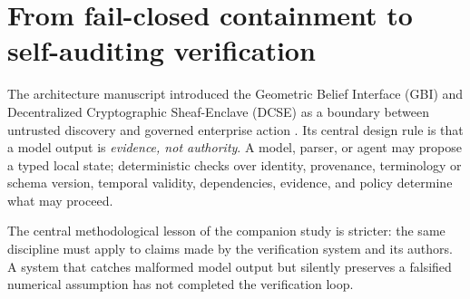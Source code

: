 \documentclass[11pt]{article}
\begin{document}
\begin{abstract}
Third, GBI-DCSE v3 maps 99 manuscript claims to machine-readable evidence classes and resolvers. Ninety-five of 96 testable registered claims meet their declared acceptance criteria, three claims remain explicitly out of scope, and the Fisher statement is retained as one erratum. The standalone verifier executes 148 declared checks with zero implementation failures; a check can pass by correctly reproducing a value, detecting a fault, or confirming an \texttt{ERRATUM}/\texttt{OUT OF SCOPE} classification, so 148/148 passing checks is not a claim that all 99 registered assertions are true. The harness also exercises signed-ledger behavior, attestation failure classes, a PBFT-style quorum model, sparse certificate forgery tests, atomic rollback, replayable receipts, and a second synthetic domain.

The resulting claim is deliberately bounded. Under the declared synthetic populations, GBI-DCSE behaves as a selective, policy-versioned, self-auditing test and routing substrate. BoundaryBench v0.2, GBI v2, and DCSE v3 execute no new language model and do not establish clinical safety, production readiness, correctness of institutional policy, or robustness to arbitrary adaptive attackers. Those system boundaries are stated once near the beginning and treated as part of the evaluation contract.
\end{abstract}

\tableofcontents
\newpage

\section{From fail-closed containment to self-auditing verification}
\label{sec:introduction}

The architecture manuscript introduced the Geometric Belief Interface (GBI) and Decentralized Cryptographic Sheaf-Enclave (DCSE) as a boundary between untrusted discovery and governed enterprise action \cite{spivey2026gbi}. Its central design rule is that a model output is \emph{evidence, not authority}. A model, parser, or agent may propose a typed local state; deterministic checks over identity, provenance, terminology or schema version, temporal validity, dependencies, evidence, and policy determine what may proceed.

The central methodological lesson of the companion study is stricter: the same discipline must apply to claims made by the verification system and its authors. A system that catches malformed model output but silently preserves a falsified numerical assumption has not completed the verification loop.
\end{document}
